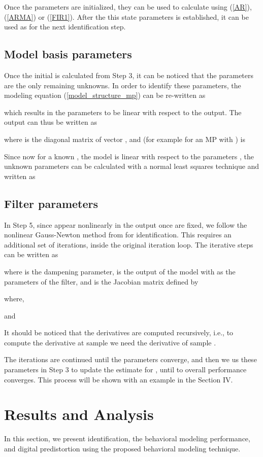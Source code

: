\documentclass[journal]{IEEEtran}
\begin{document}
Once the parameters are initialized, they can be used to calculate  using (\ref{AR}), (\ref{ARMA}) or (\ref{FIR1}). After 
the this state parameters is established, it can be used as for the next identification step.



\subsection{Model basis parameters}
Once the initial  is calculated from Step 3, it can be noticed that the parameters  are the only remaining unknowns. In order to identify these parameters, the modeling equation (\ref{model_structure_mp}) can be re-written as

which results in the parameters  to be linear with respect to the output. The output can thus be written as

where  is the diagonal matrix of vector , and  (for example for an MP with ) is


Since now for a known , the model is linear with respect to the parameters , the unknown parameters  can be calculated with a normal least squares technique and written as



\subsection{Filter parameters}
In Step 5, since  appear nonlinearly in the output once  are fixed, we follow the nonlinear Gauss-Newton method from \cite[p. 260]{kay} for identification. This requires an additional set of iterations, inside the original iteration loop. The iterative steps can be written as

where  is the dampening parameter,  is the output of the model with  as the parameters of the filter, and  is the Jacobian matrix defined by

where,

and

It should be noticed that the derivatives are computed recursively, i.e., to compute the derivative at sample  we need the derivative of sample .

The iterations are continued until the parameters converge, and then we us these parameters in Step 3 to update the estimate for , until to overall performance converges. This process will be shown with an example in the Section IV.

\section{Results and Analysis}
In this section, we present identification, the behavioral modeling performance, and digital predistortion using the proposed behavioral modeling technique.
\end{document}
